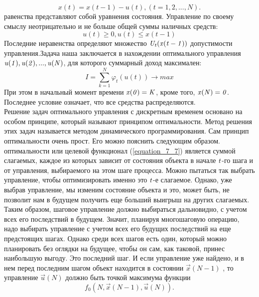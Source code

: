  \begin{equation*}
x(t)=x(t-1)-u(t), (t=1,2,...,N).
\end{equation*}
 равенства представляют собой уравнения состояния. Управление по своему смыслу неотрицательно и не больше общей суммы наличных средств:
 \begin{equation*}
u(t) \ge 0, u(t)  \le x(t-1)
\end{equation*}
Последние неравенства определяют множество $\it U_t(x(t-1))$  допустимости управления.Задача наша заключается в нахождении оптимального управления $\it u(1),u(2),...,u(N)$, для которого суммарный доход максимален:
\begin{equation*}
I = \sum_{k=1}^N \varphi_t(u(t)) \rightarrow max
\end{equation*}
\indent При этом в начальный момент времени $\it x(0)=K$, кроме того,  $\it x(N)=0$. Последнее условие означает, что все средства распределяются.\\
 Решение задач оптимального управления с дискретным временем основано на особом принципе, который называют принципом оптимальности. Метод решения этих задач называется методом динамического
программирования. Сам принцип оптимальности очень прост. Его можно пояснить следующим образом. \\
 оптимальности или целевой функционал  (\ref{equation_7_7}) является суммой слагаемых, каждое из которых зависит от состояния объекта в начале $\it t$-го шага и от управления, выбираемого на этом шаге процесса. Можно пытаться так выбрать управление, чтобы оптимизировать именно это  $\it t$-е слагаемое. Однако, уже выбрав управление, мы изменим состояние объекта и это, может быть, не позволит нам в будущем получить еще больший выигрыш на других слагаемых. Таким образом, шаговое управление должно выбираться дальновидно, с учетом всех его последствий в будущем. Значит, планируя многошаговую операцию, надо выбирать управление с учетом всех его будущих последствий на еще предстоящих шагах. Однако среди всех шагов есть один, который можно планировать без оглядки на будущее, чтобы он сам, как таковой, принес наибольшую выгоду. Это последний шаг. И если управление уже найдено, и в нем перед последним шагом объект находится в состоянии $\vec{x}(N-1)$ , то управление $\vec{u}(N)$ должно быть точкой максимума функции
\begin{equation*}
f_0(N,\vec{x}(N-1),\vec{u}(N)).
\end{equation*}
